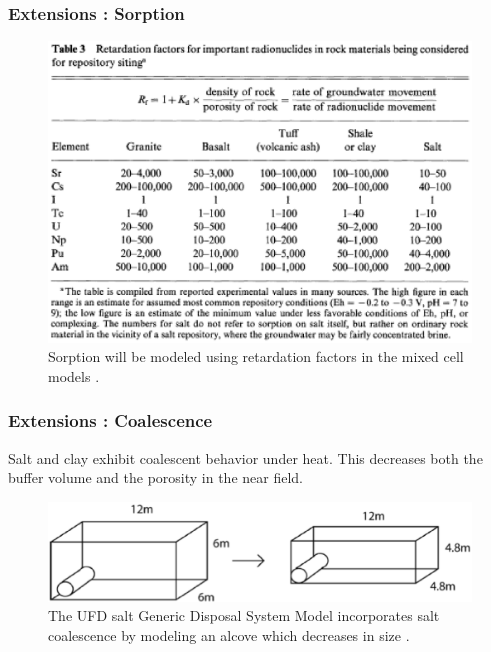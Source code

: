 \begin{frame}[ctb!]
  \frametitle{Extensions : Sorption}
  \begin{figure}[h!]
      \includegraphics[height=.75\textheight]{./images/sorptionKrauskopf.eps}
    \caption{Sorption will be modeled using retardation factors in the mixed 
    cell models \cite{krauskopf_geology_1988}.}
    \label{fig:sorptionKrauskopf}
  \end{figure}
\end{frame}


\begin{frame}[ctb!]
  \frametitle{Extensions : Coalescence}
  Salt and clay exhibit coalescent behavior under heat. This decreases both the 
  buffer volume and the porosity in the near field.
  \begin{figure}[h!]
    \begin{center}
      \includegraphics[width=\textwidth]{./images/saltAlcoveGPAM.eps}
    \end{center}
    \caption{The UFD salt Generic Disposal System Model incorporates salt 
    coalescence by modeling an alcove which decreases in size 
    \cite{clayton_generic_2011}.}
    \label{fig:saltAlcoveGPAM}
  \end{figure}
\end{frame}

